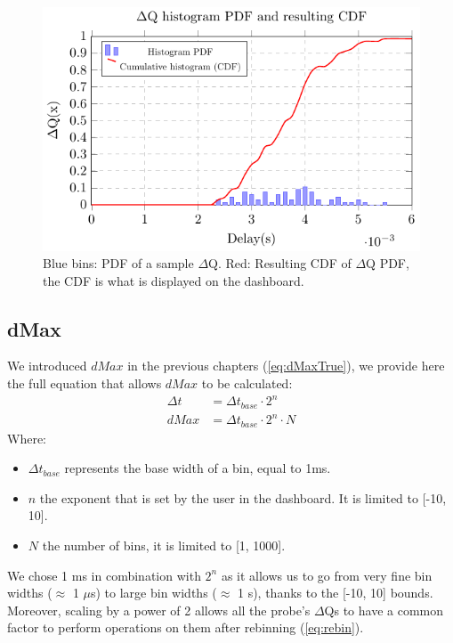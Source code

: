     \begin{figure}[H]
            \begin{center}
                \includegraphics[scale=1]{tikz/pdf_dq.pdf} 
            \end{center}
            \caption{Blue bins: PDF of a sample $\Delta$Q. Red: Resulting CDF of $\Delta$Q PDF, the CDF is what is displayed on the dashboard.}
        \end{figure}

    \subsection{dMax}
        We introduced $dMax$ in the previous chapters (\cref{eq:dMaxTrue}), we provide here the full equation that allows $dMax$ to be calculated:
        \begin{equation}
            \begin{split}
                \Delta t &= \Delta t_{base} \cdot 2^n \\ 
                dMax &= \Delta t_{base} \cdot 2^n \cdot N  
            \end{split}
            \label{eq:dMaxU}
        \end{equation}
        Where:
        \begin{itemize}
            \item $\Delta t_{base}$ represents the base width of a bin, equal to 1ms.
            \item $n$ the exponent that is set by the user in the dashboard. It is limited to [-10, 10].
            \item $N$ the number of bins, it is limited to [1, 1000].
        \end{itemize}
            We chose 1 ms in combination with $2^n$ as it allows us to go from very fine bin widths ($\approx$ 1 $\mu$s) to large bin widths ($\approx$ 1 s), thanks to the [-10, 10] bounds. Moreover, scaling by a power of 2 allows all the probe's $\Delta$Qs to have a common factor to perform operations on them after rebinning (\cref{eq:rebin}).

